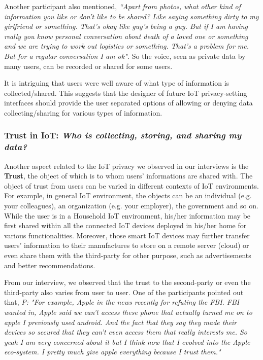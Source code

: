 Another participant also mentioned, \textit {``Apart from photos, what other kind of information you like or don't like to be shared? Like saying something dirty to my girlfriend or something. That's okay like guy's being a guy. But if I am having really you know personal conversation about death of a loved one or something and we are trying to work out logistics or something. That's a problem for me. But for a regular conversation I am ok".} So the voice, seen as private data by many users, can be recorded or shared for some users.

It is intriguing that users were well aware of what type of information is collected/shared. This suggests that the designer of future IoT privacy-setting interfaces should provide the user separated options of allowing or denying data collecting/sharing for various types of information.

\subsubsection{Trust in IoT: \textit{Who is collecting, storing, and sharing my data?}}
Another aspect related to the IoT privacy we observed in our interviews is the \textbf{Trust}, the object of which is to whom users' informations are shared with. The object of trust from users can be varied in different contexts of IoT environments. For example, in general IoT environment, the objects can be an individual (e.g. your colleagues), an organization (e.g. your employer), the government and so on. While the user is in a Household IoT environment, his/her information may be first shared within all the connected IoT devices deployed in his/her home for various functionalities. Moreover, those smart IoT devices may further transfer users' information to their manufactures to store on a remote server (cloud) or even share them with the third-party for other purpose, such as advertisements and better recommendations. 

From our interview, we observed that the trust to the second-party or even the third-party also varies from user to user. One of the participants pointed out that, \textit{P: "For example, Apple in the news recently for refuting the FBI. FBI wanted in, Apple said we can't access these phone that actually turned me on to apple I previously used android. And the fact that they say they made their devices so secured that they can't even access them that really interests me. So yeah I am very concerned about it but I think now that I evolved into the Apple eco-system. I pretty much give apple everything because I trust them."}

